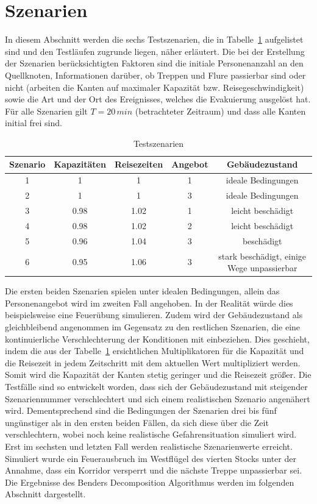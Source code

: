 \documentclass[a4paper, 11pt]{scrreprt}
\begin{document}
\section{Szenarien}
In diesem Abschnitt werden die sechs Testszenarien, die in Tabelle~\ref{tab:scenarios} aufgelistet sind und den
Testläufen zugrunde liegen, näher erläutert.
Die bei der Erstellung der Szenarien berücksichtigten Faktoren sind die initiale Personenanzahl an
den Quellknoten, Informationen darüber, ob Treppen und Flure passierbar sind oder nicht (arbeiten die Kanten
auf maximaler Kapazität bzw. Reisegeschwindigkeit) sowie die Art und der Ort des Ereignisses, welches die
Evakuierung ausgelöst hat.
Für alle Szenarien gilt $T = 20\,min$ (betrachteter Zeitraum) und dass alle Kanten initial frei sind.
\begin{table}[htb!]
\centering
\caption{Testszenarien}
\label{tab:scenarios}
\begin{tabular}[c]{|c|c|c|c|c|}\hline
  Szenario & Kapazitäten & Reisezeiten & Angebot & Gebäudezustand\\\hline\hline
  1 & 1    & 1    & 1 & ideale Bedingungen \\\hline
  2 & 1    & 1    & 3 & ideale Bedingungen \\\hline
  3 & 0.98 & 1.02 & 1 & leicht beschädigt \\\hline
  4 & 0.98 & 1.02 & 2 & leicht beschädigt \\\hline
  5 & 0.96 & 1.04 & 3 & beschädigt \\\hline
  6 & 0.95 & 1.06 & 3 & stark beschädigt, einige Wege unpassierbar \\\hline
\end{tabular}
\end{table}
Die ersten beiden Szenarien spielen unter idealen Bedingungen, allein das Personenangebot wird im zweiten
Fall angehoben. In der Realität würde dies beispielsweise eine Feuerübung simulieren.
Zudem wird der Gebäudezustand als gleichbleibend angenommen im Gegensatz zu den restlichen
Szenarien, die eine kontinuierliche Verschlechterung der Konditionen mit einbeziehen.
Dies geschieht, indem die aus der Tabelle~\ref{tab:scenarios} ersichtlichen Multiplikatoren für die Kapazität und
die Reisezeit in jedem Zeitschritt mit dem aktuellen Wert multipliziert werden.
Somit wird die Kapazität der Kanten stetig geringer und die Reisezeit größer.
Die Testfälle sind so entwickelt worden, dass sich der Gebäudezustand mit steigender Szenariennummer
verschlechtert und sich einem realistischen Szenario angenähert wird.
Dementsprechend sind die Bedingungen der Szenarien drei bis fünf ungünstiger als in den ersten beiden Fällen,
da sich diese über die Zeit verschlechtern, wobei noch keine realistische Gefahrensituation simuliert wird.
Erst im sechsten und letzten Fall werden realistische Szenarienwerte erreicht. Simuliert wurde ein
Feuerausbruch im Westflügel des vierten Stocks unter der Annahme, dass ein Korridor versperrt und die
nächste Treppe unpassierbar sei.\\
Die Ergebnisse des Benders Decomposition Algorithmus werden im folgenden Abschnitt dargestellt.
\end{document}
